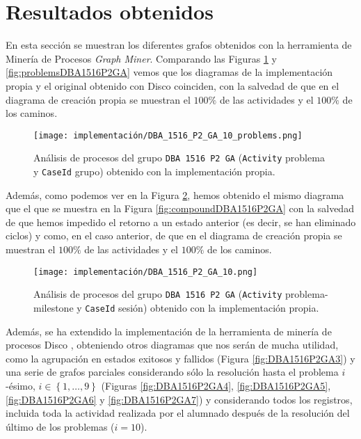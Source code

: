 \section{Resultados obtenidos}

En esta sección se muestran los diferentes grafos obtenidos con la herramienta de Minería de Procesos \emph{Graph Miner}. Comparando las Figuras \ref{fig:DBA1516P2GA1} y \ref{fig:problemsDBA1516P2GA} vemos que los diagramas de la implementación propia y el original obtenido con Disco coinciden, con la salvedad de que en el diagrama de creación propia se muestran el $100\%$ de las actividades y el $100\%$ de los caminos.

\begin{figure}[H]
    \centering
    \texttt{[image: implementación/DBA\_1516\_P2\_GA\_10\_problems.png]}
    \caption{Análisis de procesos del grupo \texttt{DBA 1516 P2 GA} (\texttt{Activity} problema y \texttt{CaseId} grupo) obtenido con la implementación propia.}
    \label{fig:DBA1516P2GA1}
\end{figure}

Además, como podemos ver en la Figura \ref{fig:DBA1516P2GA2}, hemos obtenido el mismo diagrama que el que se muestra en la Figura \ref{fig:compoundDBA1516P2GA} con la salvedad de que hemos impedido el retorno a un estado anterior (es decir, se han eliminado ciclos) y como, en el caso anterior, de que en el diagrama de creación propia se muestran el $100\%$ de las actividades y el $100\%$ de los caminos.

\begin{figure}[H]
    \centering
    \texttt{[image: implementación/DBA\_1516\_P2\_GA\_10.png]}
    \caption{Análisis de procesos del grupo \texttt{DBA 1516 P2 GA} (\texttt{Activity} problema-milestone y \texttt{CaseId} sesión) obtenido con la implementación propia.}
    \label{fig:DBA1516P2GA2}
\end{figure}

Además, se ha extendido la implementación de la herramienta de minería de procesos Disco \cite{gunther2012disco}, obteniendo otros diagramas que nos serán de mucha utilidad, como la agrupación en estados exitosos y fallidos (Figura \ref{fig:DBA1516P2GA3}) y una serie de grafos parciales considerando sólo la resolución hasta el problema $i$-ésimo, $i \in \left\lbrace 1,\dots,9 \right\rbrace$ (Figuras \ref{fig:DBA1516P2GA4}, \ref{fig:DBA1516P2GA5}, \ref{fig:DBA1516P2GA6} y \ref{fig:DBA1516P2GA7}) y considerando todos los registros, incluida toda la actividad realizada por el alumnado después de la resolución del último de los problemas ($i = 10$).

